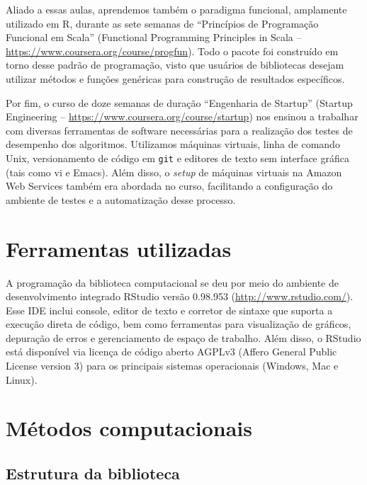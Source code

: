 Aliado a essas aulas, aprendemos também o paradigma funcional, amplamente utilizado em R, durante as sete semanas de ``Princípios de Programação Funcional em Scala'' (Functional Programming Principles in Scala -- \url{https://www.coursera.org/course/progfun}). Todo o pacote foi construído em torno desse padrão de programação, visto que usuários de bibliotecas desejam utilizar métodos e funções genéricas para construção de resultados específicos.

Por fim, o curso de doze semanas de duração ``Engenharia de Startup'' (Startup Engineering -- \url{https://www.coursera.org/course/startup}) nos ensinou a trabalhar com diversas ferramentas de software necessárias para a realização dos testes de desempenho dos algoritmos. Utilizamos máquinas virtuais, linha de comando Unix, versionamento de código em \texttt{git} e editores de texto sem interface gráfica (tais como vi e Emacs). Além disso, o \textit{setup} de máquinas virtuais na Amazon Web Services também era abordada no curso, facilitando a configuração do ambiente de testes e a automatização desse processo. 

\section{Ferramentas utilizadas} %
\label{sec:ferramentas_utilizadas}

A programação da biblioteca computacional se deu por meio do ambiente de desenvolvimento integrado RStudio versão 0.98.953 (\url{http://www.rstudio.com/}). Esse IDE inclui console, editor de texto e corretor de sintaxe que suporta a execução direta de código, bem como ferramentas para visualização de gráficos, depuração de erros e gerenciamento de espaço de trabalho. Além disso, o RStudio está disponível via licença de código aberto AGPLv3 (Affero General Public License version 3) para os principais sistemas operacionais (Windows, Mac e Linux).

\section{Métodos computacionais} %
\label{sec:m_todos_computacionais}



\subsection{Estrutura da biblioteca} %
\label{sub:estrutura_da_biblioteca}

